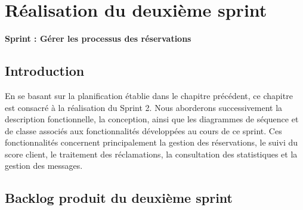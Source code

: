 \chapter{Réalisation du deuxième sprint}
\label{Chapitre_4}

{\Large\textbf{Sprint : Gérer les processus des réservations}}

\section{Introduction}
\label{Chapitre4_Introduction}

En se basant sur la planification établie dans le chapitre précédent, ce chapitre est
consacré à la réalisation du Sprint 2. Nous aborderons successivement la description
fonctionnelle, la conception, ainsi que les diagrammes de séquence et de classe
associés aux fonctionnalités développées au cours de ce sprint. Ces fonctionnalités
concernent principalement la gestion des réservations, le suivi du score client, le
traitement des réclamations, la consultation des statistiques et la gestion des messages.

\section{Backlog produit du deuxième sprint}
\label{sec:backlog_sprint2}

